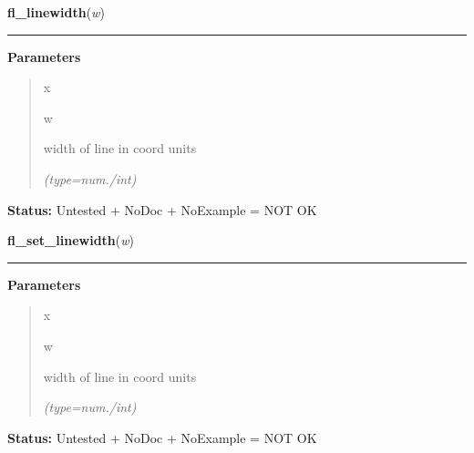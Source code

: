 \hspace{.8\funcindent}\begin{boxedminipage}{\funcwidth}

    \raggedright \textbf{fl\_linewidth}(\textit{w})

    \vspace{-1.5ex}

    \rule{\textwidth}{0.5\fboxrule}
\setlength{\parskip}{2ex}
\setlength{\parskip}{1ex}
      \textbf{Parameters}
      \vspace{-1ex}

      \begin{quote}
        \begin{Ventry}{x}

          \item[w]

          width of line in coord units

            {\it (type=num./int)}

        \end{Ventry}

      \end{quote}

\textbf{Status:} Untested + NoDoc + NoExample = NOT OK



    \end{boxedminipage}

    \label{xformslib:library:fl_linewidth}

    \vspace{0.5ex}

\hspace{.8\funcindent}\begin{boxedminipage}{\funcwidth}

    \raggedright \textbf{fl\_set\_linewidth}(\textit{w})

    \vspace{-1.5ex}

    \rule{\textwidth}{0.5\fboxrule}
\setlength{\parskip}{2ex}
\setlength{\parskip}{1ex}
      \textbf{Parameters}
      \vspace{-1ex}

      \begin{quote}
        \begin{Ventry}{x}

          \item[w]

          width of line in coord units

            {\it (type=num./int)}

        \end{Ventry}

      \end{quote}

\textbf{Status:} Untested + NoDoc + NoExample = NOT OK



    \end{boxedminipage}

